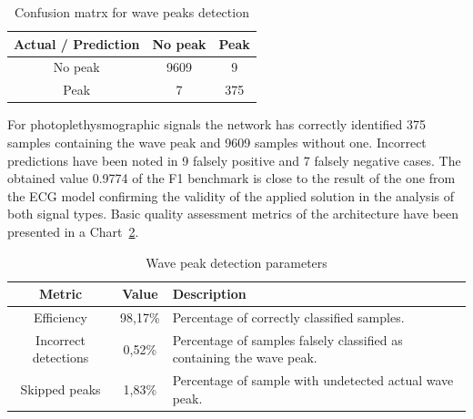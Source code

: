 \documentclass[journal]{IEEEtran}
\begin{document}
\begin{table}[ht]
\centering
\caption{Confusion matrx for wave peaks detection}
\label{tab:conf_matrix_ppg}
\begin{tabular}{|c|c|c|}
\hline
\textbf{Actual / Prediction} & \textbf{No peak } & \textbf{Peak} \\
\hline
No peak  & 9609 & 9 \\

Peak  & 7 & 375 \\
\hline
\end{tabular}
\end{table}

For photoplethysmographic signals the network has correctly identified 375 samples containing the wave peak and 9609 samples without one. Incorrect predictions have been noted in 9 falsely positive and 7 falsely negative cases. The obtained value 0.9774 of the F1 benchmark is close to the result of the one from the ECG model confirming the validity of the applied solution in the analysis of both signal types.
Basic quality assessment metrics of the architecture have been presented in a Chart~\ref{tab:metrics_ppg}.

\begin{table}[ht]
\centering
\caption{Wave peak detection parameters}
\label{tab:metrics_ppg}
\begin{tabular}{|c|c|p{4.6cm}|}
\hline
\textbf{Metric} & \textbf{Value} & \textbf{Description} \\
\hline
Efficiency & 98,17\% & Percentage of correctly classified samples. \\
Incorrect detections & 0,52\% & Percentage of samples falsely classified as containing the wave peak. \\
Skipped peaks & 1,83\% & Percentage of sample with undetected actual wave peak. \\
\hline
\end{tabular}
\end{table}
\end{document}
